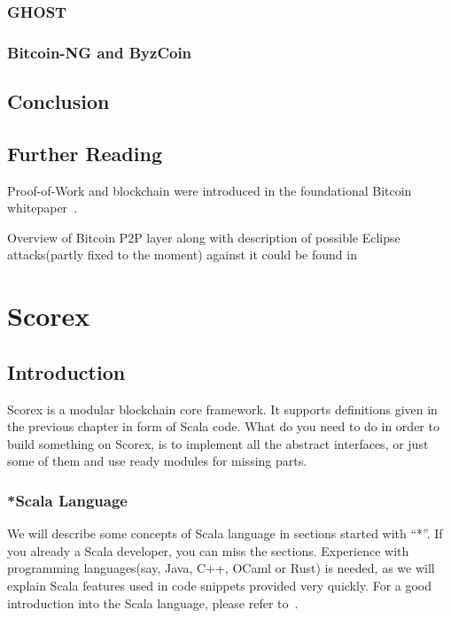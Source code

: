 \documentclass[]{report}   %
\begin{document}
\subsection{GHOST}

\subsection{Bitcoin-NG and ByzCoin}

\section{Conclusion}


\section{Further Reading}

Proof-of-Work and blockchain were introduced in the foundational Bitcoin whitepaper~\cite{Nakamoto2008}.

Overview of Bitcoin P2P layer along with description of possible Eclipse attacks(partly fixed to the moment) against it could be found in~\cite{heilman2015eclipse}


\chapter{Scorex}           %
\section{Introduction}     %

Scorex is a modular blockchain core framework. It supports definitions given in the previous chapter in form of Scala code. What do you need to do in order to build something on Scorex, is to implement all the abstract interfaces, or just some of them and use ready modules for missing parts.

\subsection{*Scala Language}         %

We will describe some concepts of Scala language in sections started with ``*''. If you already a Scala developer, you can miss the sections. Experience with programming languages(say, Java, C++, OCaml or Rust) is needed, as we will explain Scala features used in code snippets provided very quickly. For a good introduction into the Scala language, please refer to~\cite{odersky2008programming}.
\end{document}
